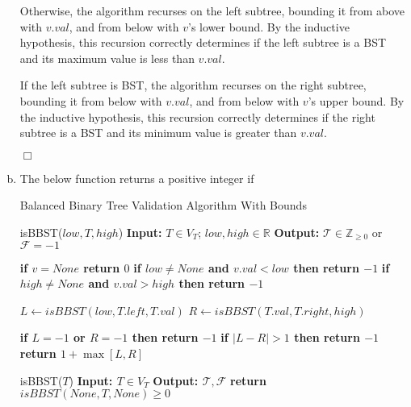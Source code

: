 \documentclass[10pt]{article}
\newenvironment{proof}{\par\noindent{\it Proof.}\hspace*{1em}}{$\Box$\bigskip}
\begin{document}
\begin{solution}
\begin{enumerate}[(a)]
{\begin{proof}
                Otherwise, the algorithm recurses on the left subtree, bounding it from above with $v.val$, and from below with $v$'s lower bound. 
                By the inductive hypothesis, this recursion correctly determines if the left subtree is a BST and its maximum value is less than $v.val$. 

                If the left subtree is BST, the algorithm recurses on the right subtree, bounding it from below with $v.val$, and from below with $v$'s upper bound. 
                By the inductive hypothesis, this recursion correctly determines if the right subtree is a BST and its minimum value is greater than $v.val$. 
                
            \end{proof}
        }
        \item {
            The below function returns a positive integer if 
            
            \begin{algorithm}[H]
                \caption{Balanced Binary Tree Validation Algorithm With Bounds}
                \begin{algorithmic}[1]
                    \Statex isBBST($low, T, high$)
                    \Statex \textbf{Input:} $T \in V_T$; $low, high \in \mathbb{R}$
                    \Statex \textbf{Output:} $\mathcal{T} \in \mathbb{Z}_{\geq0}$ or $\mathcal{F} = -1$
                    
                    \State \textbf{if $v = None$ return $0$}
                    \State \textbf{if $low \neq None$ and $v.val < low$ then return $-1$}
                    \State \textbf{if $high \neq None$ and $v.val > high$ then return $-1$}

                    \State $L \gets isBBST(low, T.left, T.val)$
                    \State $R \gets isBBST(T.val, T.right, high)$

                    \State \textbf{if $L = -1$ or $R = -1$ then return $-1$}
                    \State \textbf{if $| L - R | > 1$ then return $-1$}
                    \State \textbf{return $1 + \max[L, R]$}

                \end{algorithmic}

                \begin{algorithmic}[1]

                    \Statex isBBST($T$)
                    \Statex \textbf{Input: $T \in V_T$}
                    \Statex \textbf{Output: $\mathcal{T, F}$}
                    \State \textbf{return $isBBST(None, T, None) \geq 0$}

                \end{algorithmic}
            \end{algorithm}
        }
    \end{enumerate}

\end{solution}
\end{document}
